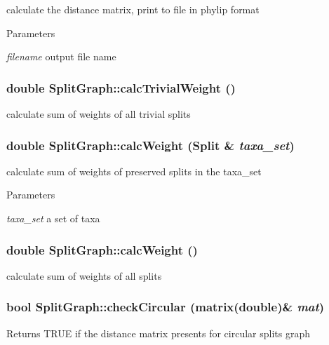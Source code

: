 \label{classSplitGraph_aff71095a191dc17326d6da9441496c37}
calculate the distance matrix, print to file in phylip format 
\begin{DoxyParams}{Parameters}
\item[{\em filename}]output file name \end{DoxyParams}
\hypertarget{classSplitGraph_a8ef03a25d1057fb09e2da7d9b3a28035}{
\subsubsection[{calcTrivialWeight}]{\setlength{\rightskip}{0pt plus 5cm}double SplitGraph::calcTrivialWeight ()}}
\label{classSplitGraph_a8ef03a25d1057fb09e2da7d9b3a28035}
calculate sum of weights of all trivial splits \hypertarget{classSplitGraph_a9404a37b5c287146c432b7ca28c0ed6e}{
\subsubsection[{calcWeight}]{\setlength{\rightskip}{0pt plus 5cm}double SplitGraph::calcWeight ({\bf Split} \& {\em taxa\_\-set})}}
\label{classSplitGraph_a9404a37b5c287146c432b7ca28c0ed6e}
calculate sum of weights of preserved splits in the taxa\_\-set 
\begin{DoxyParams}{Parameters}
\item[{\em taxa\_\-set}]a set of taxa \end{DoxyParams}
\hypertarget{classSplitGraph_aaff18dd254098b4e1912593f0e2de524}{
\subsubsection[{calcWeight}]{\setlength{\rightskip}{0pt plus 5cm}double SplitGraph::calcWeight ()}}
\label{classSplitGraph_aaff18dd254098b4e1912593f0e2de524}
calculate sum of weights of all splits \hypertarget{classSplitGraph_aab13a9043727eb04c7afa61ddf489b8f}{
\subsubsection[{checkCircular}]{\setlength{\rightskip}{0pt plus 5cm}bool SplitGraph::checkCircular (matrix(double)\& {\em mat})}}
\label{classSplitGraph_aab13a9043727eb04c7afa61ddf489b8f}
\begin{DoxyReturn}{Returns}
TRUE if the distance matrix presents for circular splits graph 
\end{DoxyReturn}

